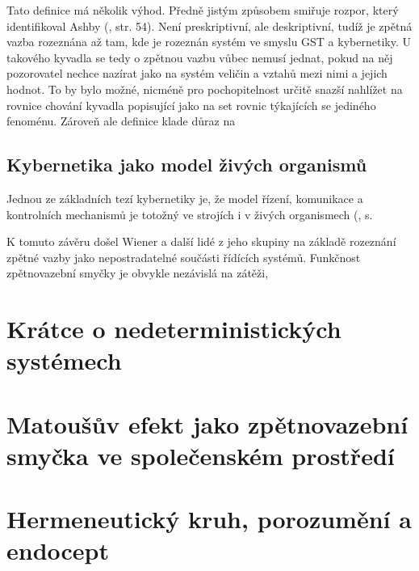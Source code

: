 \documentclass[11pt,a4paper]{article}
\begin{document}
Tato definice má několik výhod. Předně jistým způsobem smiřuje rozpor, který identifikoval Ashby (\cite*{ashby_introduction_2015}, str. 54). Není preskriptivní, ale deskriptivní, tudíž je zpětná vazba rozeznána až tam, kde je rozeznán systém ve smyslu GST a kybernetiky. U takového kyvadla se tedy o zpětnou vazbu vůbec nemusí jednat, pokud na něj pozorovatel nechce nazírat jako na systém veličin a vztahů mezi nimi a jejich hodnot. To by bylo možné, nicméně pro pochopitelnost určitě snazší nahlížet na rovnice chování kyvadla popisující jako na set rovnic týkajících se jediného fenoménu. Zároveň ale definice klade důraz na 




\subsection{Kybernetika jako model živých organismů}

Jednou ze základních tezí kybernetiky je, že model řízení, komunikace a kontrolních mechanismů je totožný ve strojích i v živých organismech (\cite{wiener_cybernetics_2019}, s. 

K tomuto závěru došel Wiener a další lidé z jeho skupiny na základě rozeznání zpětné vazby jako nepostradatelné součásti řídících systémů. Funkčnost zpětnovazební smyčky je obvykle nezávislá na zátěži,   





\section{Krátce o nedeterministických systémech}





\section{Matoušův efekt jako zpětnovazební smyčka ve společenském prostředí}




\section{Hermeneutický kruh, porozumění a endocept}
\end{document}
